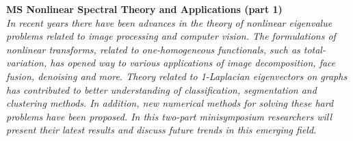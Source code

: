   \noindent\textbf{MS Nonlinear Spectral Theory and Applications (part 1)}\\
  \textit{In recent years there have been advances in the theory of nonlinear eigenvalue problems related to image processing and computer vision. The formulations of nonlinear transforms, related to one-homogeneous functionals, such as total-variation, has opened way to various applications of image decomposition, face fusion, denoising and more. Theory related to 1-Laplacian eigenvectors on graphs has contributed to better understanding of classification, segmentation and clustering methods. In addition, new numerical methods for solving these hard problems have been proposed.
In this two-part minisymposium researchers will present their latest results and discuss future trends in this emerging field.} \\
    
